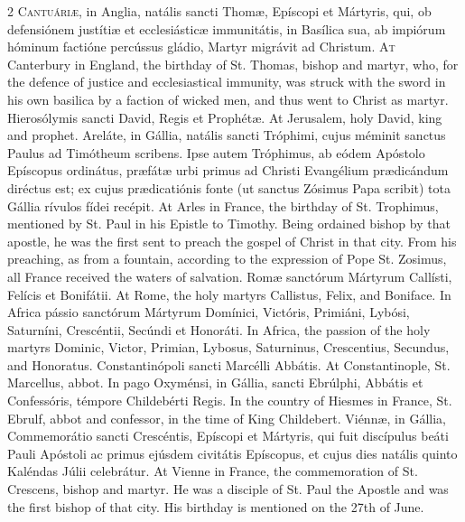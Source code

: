\begin{paracol}{2}
\lettrine[lines=2]{C}{antuáriæ,} in Anglia, natális sancti Thomæ, 
 Epíscopi et Mártyris, qui, ob defensiónem justítiæ et ecclesiásticæ 
 immunitátis, in Basílica sua, ab impiórum hóminum factióne percússus gládio, 
 Martyr migrávit ad Christum.
\switchcolumn
{}
\lettrine[lines=2]{A}{t} Canterbury in England, the birthday of St. Thomas, bishop and martyr, 
 who, for the defence of justice and ecclesiastical immunity, was struck with 
 the sword in his own basilica by a faction of wicked men, and thus went to 
 Christ as martyr.
\switchcolumn*
{}
Hierosólymis sancti David, Regis et Prophétæ.
\switchcolumn
{}
At Jerusalem, holy David, king and prophet.
\switchcolumn*
{}
Areláte, in Gállia, natális sancti Tróphimi, 
 cujus méminit sanctus Paulus ad Timótheum scribens. Ipse autem 
 Tróphimus, ab eódem Apóstolo Epíscopus ordinátus, præfátæ urbi primus ad 
 Christi Evangélium prædicándum diréctus est; ex cujus prædicatiónis fonte (ut 
 sanctus Zósimus Papa scribit) tota Gállia rívulos fídei recépit.
\switchcolumn
{}
At Arles in France, the birthday of St. Trophimus, mentioned by St. Paul in 
 his Epistle to Timothy. Being ordained bishop by that apostle, he was 
 the first sent to preach the gospel of Christ in that city. From his 
 preaching, as from a fountain, according to the expression of Pope St. 
 Zosimus, all France received the waters of salvation.
\switchcolumn*
{}
Romæ sanctórum Mártyrum Callísti, Felícis et Bonifátii.
\switchcolumn
{}
At Rome, the holy martyrs Callistus, Felix, and Boniface.
\switchcolumn*
{}
In Africa pássio sanctórum Mártyrum Domínici, Victóris, Primiáni, Lybósi, 
 Saturníni, Crescéntii, Secúndi et Honoráti.
\switchcolumn
{}
In Africa, the passion of the holy martyrs Dominic, Victor, Primian, Lybosus, 
 Saturninus, Crescentius, Secundus, and Honoratus.
\switchcolumn*
{}
Constantinópoli sancti Marcélli Abbátis.
\switchcolumn
{}
At Constantinople, St. Marcellus, abbot.
\switchcolumn*
{}
In pago Oxyménsi, in Gállia, sancti Ebrúlphi, Abbátis et Confessóris, 
 témpore Childebérti Regis.
\switchcolumn
{}
In the country of Hiesmes in France, St. Ebrulf, abbot and confessor, in the 
 time of King Childebert.
\switchcolumn*
{}
Viénnæ, in Gállia, Commemorátio sancti 
 Crescéntis, Epíscopi et Mártyris, qui fuit discípulus beáti Pauli Apóstoli 
 ac primus ejúsdem civitátis Epíscopus, et cujus dies natális quinto Kaléndas 
 Júlii celebrátur.
\switchcolumn
{}
At Vienne in France, the commemoration of St. Crescens, bishop and martyr. 
 He was a disciple of St. Paul the Apostle and was the first bishop of that 
 city. His birthday is mentioned on the 27th of June.
\switchcolumn*
{}
\end{paracol}


